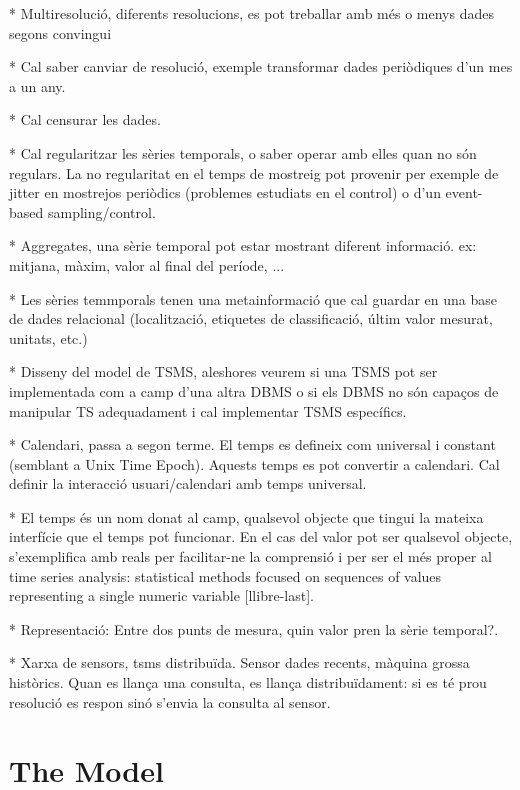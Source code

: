 \documentclass{scrartcl}
\begin{document}
* Multiresolució, diferents resolucions, es pot treballar amb més o menys dades segons convingui

* Cal saber canviar de resolució, exemple transformar dades periòdiques d'un mes a un any.

* Cal censurar les dades.

* Cal regularitzar les sèries temporals, o saber operar amb elles quan no són regulars. La no regularitat en el temps de mostreig pot provenir per exemple de jitter en mostrejos periòdics (problemes estudiats en el control) o d'un event-based sampling/control.


* Aggregates, una sèrie temporal pot estar mostrant diferent informació. ex: mitjana, màxim, valor al final del període, ...

* Les sèries temmporals tenen una metainformació que cal guardar en una base de dades relacional (localització, etiquetes de classificació, últim valor mesurat, unitats, etc.)

* Disseny del model de TSMS, aleshores veurem si una TSMS pot ser implementada com a camp d'una altra DBMS o si els DBMS no són capaços de manipular TS adequadament i cal implementar TSMS específics.

* Calendari, passa a segon terme. El temps es defineix com universal i constant (semblant a Unix Time Epoch). Aquests temps es pot convertir a calendari. Cal definir la interacció usuari/calendari amb temps universal.

* El temps és un nom donat al camp, qualsevol objecte que tingui la mateixa interfície que el temps pot funcionar. En el cas del valor pot ser qualsevol objecte, s'exemplifica amb reals per facilitar-ne la comprensió i per ser el més proper al time series analysis: statistical methods focused on sequences of values representing a single numeric variable [llibre-last].


* Representació: Entre dos punts de mesura, quin valor pren la sèrie temporal?.


* Xarxa de sensors, tsms distribuïda. Sensor dades recents, màquina grossa històrics. Quan es llança una consulta, es llança distribuïdament: si es té prou resolució es respon sinó s'envia la consulta al sensor. 




\section{The Model}



\end{document}
